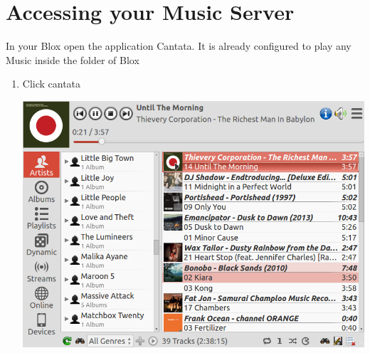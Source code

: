 \documentclass[letterpaper,10pt,english]{sphinxmanual}
\begin{document}
\section{Accessing your Music Server}
\label{music:id3}\label{music:accessing-your-music-server}
In your Blox open the application Cantata. It is already configured to play any Music inside the folder of Blox
\begin{enumerate}
\item {} 
Click cantata

\includegraphics{cantata.png}

\end{enumerate}
\end{document}
